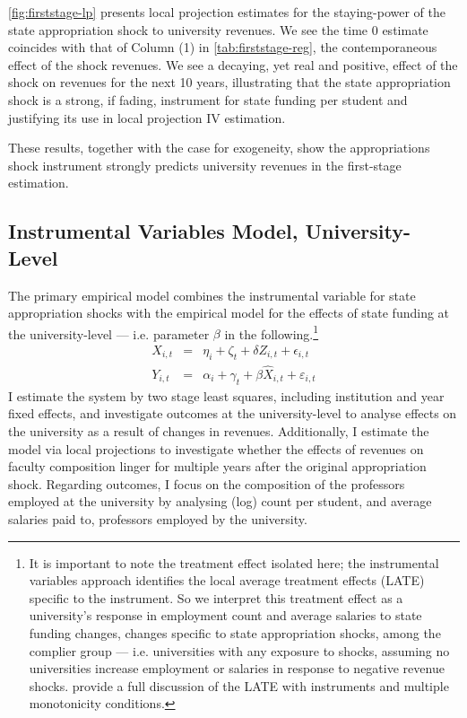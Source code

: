 \documentclass[notitlepage,12pt]{article}
\begin{document}
\autoref{fig:firststage-lp} presents local projection estimates for the staying-power of the state appropriation shock to university revenues.
We see the time 0 estimate coincides with that of Column (1) in \autoref{tab:firststage-reg}, the contemporaneous effect of the shock revenues.
We see a decaying, yet real and positive, effect of the shock on revenues for the next 10 years, illustrating that the state appropriation shock is a strong, if fading, instrument for state funding per student and justifying its use in local projection IV estimation.

These results, together with the case for exogeneity, show the appropriations shock instrument strongly predicts university revenues in the first-stage estimation.


\subsection{Instrumental Variables Model, University-Level}
\label{sec:iv-model-uni}

The primary empirical model combines the instrumental variable for state appropriation shocks with the empirical model for the effects of state funding at the university-level --- i.e. parameter $\beta$ in the following.\footnote{
    It is important to note the treatment effect isolated here; the instrumental variables approach identifies the local average treatment effects (LATE) specific to the instrument.
    So we interpret this treatment effect as a university's response in employment count and average salaries to state funding changes, changes specific to state appropriation shocks, among the complier group --- i.e. universities with any exposure to shocks, assuming no universities increase employment or salaries in response to negative revenue shocks.
    \cite{mogstad2021causal} provide a full discussion of the LATE with instruments and multiple monotonicity conditions.
}
\begin{eqnarray}
    \label{eqn:secondstage1}
    X_{i,t} &=& \eta_i + \zeta_t + \delta Z_{i,t} + \epsilon_{i,t} \\
    \label{eqn:secondstage2}
    Y_{i,t} &=& \alpha_i + \gamma_t + \beta \widehat X_{i,t} + \varepsilon_{i,t}
\end{eqnarray}
I estimate the system by two stage least squares, including institution and year fixed effects, and investigate outcomes at the university-level to analyse effects on the university as a result of changes in revenues.
Additionally, I estimate the model via local projections \citep{jorda2005,miller2022} to investigate whether the effects of revenues on faculty composition linger for multiple years after the original appropriation shock.
Regarding outcomes, I focus on the composition of the professors employed at the university by analysing (log) count per student, and average salaries paid to, professors employed by the university.
\end{document}
